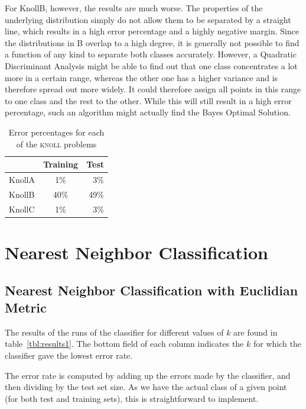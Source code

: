 \documentclass{article}
\begin{document}
For KnollB, however, the results are much worse. The properties of the underlying distribution simply
do not allow them to be separated by a straight line, which results in a high error percentage and a highly negative margin.
Since the distributions in B overlap to a high degree, it is generally not possible to find a function of any kind
to separate both classes accurately. However, a Quadratic Discriminant Analysis might be able to find out that one class
concentrates a lot more in a certain range, whereas the other one has a higher variance and is therefore spread out more widely.
It could therefore assign all points in this range to one class and the rest to the other. While this will still result in a high
error percentage, such an algorithm might actually find the Bayes Optimal Solution.

\begin{table}
\begin{tabular}{|l|c|r|}
  \hline
   & Training & Test \\
  \hline
  KnollA & 1\% & 3\% \\
  KnollB & 40\% & 49\% \\
  KnollC & 1\% & 3\% \\
  \hline
  \end{tabular}
  \caption{Error percentages for each of the \textsc{knoll} problems}
  \label{tab:ldaknollerror}
\end{table}

\newpage
\section{Nearest Neighbor Classification}

\subsection{Nearest Neighbor Classification with Euclidian Metric}

The results of the runs of the classifier for different values of $k$
are found in table~\ref{tbl:results1}. The bottom field of each column
indicates the $k$ for which the classifier gave the lowest error rate.

The error rate is computed by adding up the errors made by the
classifier, and then dividing by the test set size. As we have the
actual class of a given point (for both test and training sets), this
is straightforward to implement.
\end{document}
